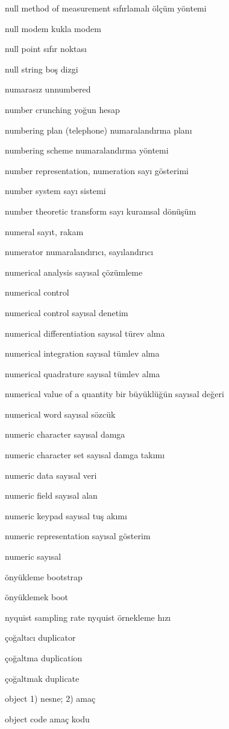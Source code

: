 \documentclass[12pt,fleqn]{article}\usepackage{../../common}
\begin{document}
null method of measurement sıfırlamalı ölçüm yöntemi

null modem kukla modem

null point sıfır noktası

null string boş dizgi

numarasız unnumbered

number crunching yoğun hesap

numbering plan (telephone) numaralandırma planı

numbering scheme numaralandırma yöntemi

number representation, numeration sayı gösterimi

number system sayı sistemi

number theoretic transform sayı kuramsal dönüşüm

numeral sayıt, rakam

numerator numaralandırıcı, sayılandırıcı

numerical analysis sayısal çözümleme

numerical control

numerical control sayısal denetim

numerical differentiation sayısal türev alma

numerical integration sayısal tümlev alma

numerical quadrature sayısal tümlev alma

numerical value of a quantity bir büyüklüğün sayısal değeri

numerical word sayısal sözcük

numeric character sayısal damga

numeric character set sayısal damga takımı

numeric data sayısal veri

numeric field sayısal alan

numeric keypad sayısal tuş akımı

numeric representation sayısal gösterim

numeric sayısal

önyükleme bootstrap

önyüklemek boot

nyquist sampling rate nyquist örnekleme hızı

çoğaltıcı duplicator

çoğaltma duplication

çoğaltmak duplicate

object 1) nesne; 2) amaç

object code amaç kodu
\end{document}
